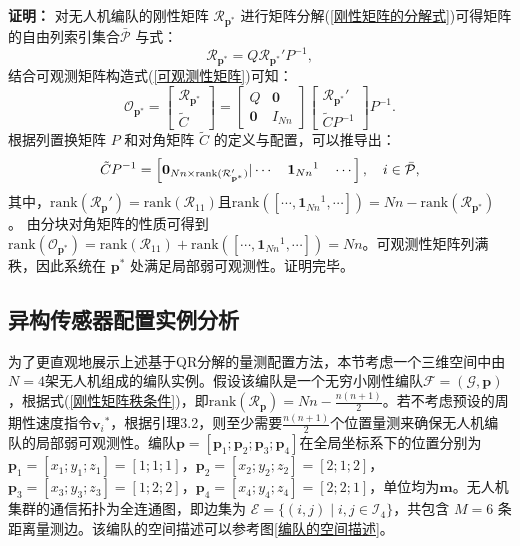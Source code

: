 \textbf{证明：} 对无人机编队的刚性矩阵 ${\mathcal{R}}_{\mathbf{p}^*}$ 进行矩阵分解(\ref{刚性矩阵的分解式})可得矩阵的自由列索引集合$ \bar{\mathcal{P}} $ 与式：
\begin{equation}
	{\mathcal{R}}_{\mathbf{p}^*}=  Q \mathcal{R}_{\mathbf{p}^*}' P^{-1},
\end{equation}
结合可观测矩阵构造式(\ref{可观测性矩阵})可知：
\begin{equation}
	\mathcal{O}_{\mathbf{p}^*} = 
	\begin{bmatrix}
		\mathcal{R}_{\mathbf{p}^*}  \\
		\tilde{C}
	\end{bmatrix} = \begin{bmatrix}
	Q & \mathbf{0} \\
	\mathbf{0} & I_{Nn}
	\end{bmatrix}
	\begin{bmatrix}
		\mathcal{R}_{\mathbf{p}^*}'\\ 
		\tilde{C} P^{-1}
	\end{bmatrix}
	P^{-1}.
\end{equation}
根据列置换矩阵 $P$ 和对角矩阵 $\tilde{C}$ 的定义与配置，可以推导出：
\begin{equation}
	\tilde{C} P^{-1} = 
	\left[
		\mathbf{0}_{Nn \times \text{rank} (\mathcal{R}_{\mathbf{p}^*}')}
		\arrowvert
		\cdots \quad
		{\mathbf{1}_{Nn}}^1 \quad
		\cdots
	\right],
	\quad
	i \in \bar{\mathcal{P}},
\end{equation}
其中，$ \text{rank}(\mathcal{R}_{\mathbf{p}}') = \text{rank}(\mathcal{R}_{11}) $且$ \text{rank}([\cdots,{\mathbf{1}_{Nn}}^1,\cdots])=Nn-\text{rank}(\mathcal{R}_{\mathbf{p}^*}) $ 。
由分块对角矩阵的性质可得到$  \text{rank}(\mathcal{O}_{\mathbf{p}^*}) = \text{rank}(\mathcal{R}_{11})+ \text{rank}([\cdots,{\mathbf{1}_{Nn}}^1,\cdots]) = Nn $。可观测性矩阵列满秩，因此系统在 $\mathbf{p}^{*}$ 处满足局部弱可观测性。证明完毕。


\subsection{异构传感器配置实例分析}
\label{异构传感器配置实例分析}

为了更直观地展示上述基于QR分解的量测配置方法，本节考虑一个三维空间中由$N=4$架无人机组成的编队实例。假设该编队是一个无穷小刚性编队$ \mathcal{F}=(\mathcal{G}, \mathbf{p})$，根据式(\ref{刚性矩阵秩条件})，即$ \text{rank}(\mathcal{R}_{\mathbf{p}})=Nn-\frac{n(n+1)}{2}$。若不考虑预设的周期性速度指令${\mathbf{v}_i}^*$，根据引理3.2，则至少需要$\frac{n(n+1)}{2}$个位置量测来确保无人机编队的局部弱可观测性。编队$\mathbf{p}=[\mathbf{p}_1;\mathbf{p}_2;\mathbf{p}_3;\mathbf{p}_4]$在全局坐标系下的位置分别为 $\mathbf{p}_1=[x_1;y_1;z_1]=[1;1;1]$，$\mathbf{p}_2=[x_2;y_2;z_2]=[2;1;2]$，$\mathbf{p}_3=[x_3;y_3;z_3]=[1;2;2]$，$\mathbf{p}_4=[x_4;y_4;z_4]=[2;2;1]$，单位均为$\mathbf{m}$。无人机集群的通信拓扑为全连通图，即边集为 $\mathcal{E}=\{(i,j)\mid i,j\in \mathcal{I}_{4}\}$，共包含 $M=6$ 条距离量测边。该编队的空间描述可以参考图\ref{编队的空间描述}。

